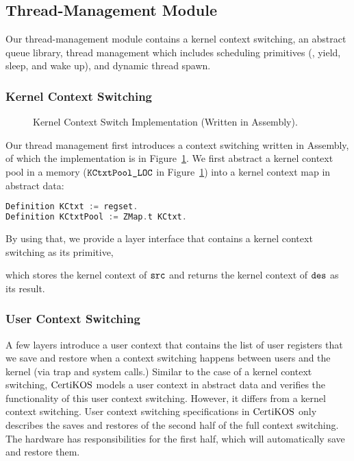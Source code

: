 \subsection{Thread-Management Module}
\label{chapter:certikos:subsec:process-management-module}
Our thread-management module contains 
a kernel context switching, an abstract queue library, thread management which includes scheduling primitives (\ie, yield, sleep, and wake up),
and dynamic thread spawn.

\subsubsection{Kernel Context Switching}

\begin{figure}
 
\caption{Kernel Context Switch Implementation (Written in Assembly).}
\label{fig:chapter:certikos:kernel-context-switch-impl}
\end{figure}
Our thread management first introduces a context switching written in Assembly, of which the implementation is in Figure~\ref{fig:chapter:certikos:kernel-context-switch-impl}.
We first abstract a kernel context pool in a memory (${\mathrm{\texttt{KCtxtPool\_LOC}}}$ in Figure~\ref{fig:chapter:certikos:kernel-context-switch-impl}) 
into a kernel context map in abstract data:
\begin{lstlisting}[language = C, deletekeywords = {Context}]
Definition KCtxt := regset.
Definition KCtxtPool := ZMap.t KCtxt.
\end{lstlisting}
By using that, we provide a layer interface that contains a kernel context switching as its primitive,

which stores the kernel context of ${\mathrm{\texttt{src}}}$ and returns the kernel context of ${\mathrm{\texttt{des}}}$ as its result.


\subsubsection{User Context Switching}

A few layers introduce a user context that contains the list of user registers that we save and restore when 
a context switching happens between users and the kernel (via trap and system calls.)
Similar to the case of a kernel context switching, $\mathrm{CertiKOS}$ models a user context in abstract data and verifies the functionality of this user context switching. 
However, it differs from a kernel context switching.
User context switching specifications in $\mathrm{CertiKOS}$ only describes the saves and restores of the second half of the full context switching.
The hardware has responsibilities for the first half, which will automatically save and restore them.



